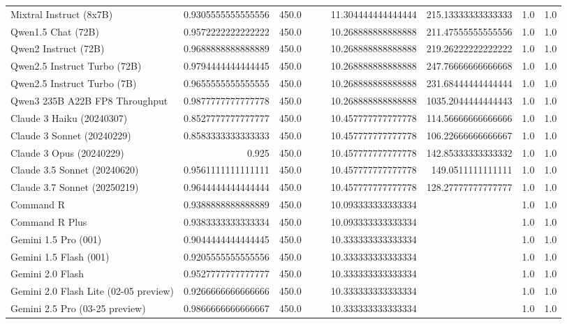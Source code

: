 \begin{table}[htp]
{\begin{tabular}{lrrrrrrrr}
Mixtral Instruct (8x7B) & 0.9305555555555556 & 450.0 &  &  & 11.304444444444444 & 215.13333333333333 & 1.0 & 1.0 \\
Qwen1.5 Chat (72B) & 0.9572222222222222 & 450.0 &  &  & 10.268888888888888 & 211.47555555555556 & 1.0 & 1.0 \\
Qwen2 Instruct (72B) & 0.9688888888888889 & 450.0 &  &  & 10.268888888888888 & 219.26222222222222 & 1.0 & 1.0 \\
Qwen2.5 Instruct Turbo (72B) & 0.9794444444444445 & 450.0 &  &  & 10.268888888888888 & 247.76666666666668 & 1.0 & 1.0 \\
Qwen2.5 Instruct Turbo (7B) & 0.9655555555555555 & 450.0 &  &  & 10.268888888888888 & 231.68444444444444 & 1.0 & 1.0 \\
Qwen3 235B A22B FP8 Throughput & 0.9877777777777778 & 450.0 &  &  & 10.268888888888888 & 1035.2044444444443 & 1.0 & 1.0 \\
Claude 3 Haiku (20240307) & 0.8527777777777777 & 450.0 &  &  & 10.457777777777778 & 114.56666666666666 & 1.0 & 1.0 \\
Claude 3 Sonnet (20240229) & 0.8583333333333333 & 450.0 &  &  & 10.457777777777778 & 106.22666666666667 & 1.0 & 1.0 \\
Claude 3 Opus (20240229) & 0.925 & 450.0 &  &  & 10.457777777777778 & 142.85333333333332 & 1.0 & 1.0 \\
Claude 3.5 Sonnet (20240620) & 0.9561111111111111 & 450.0 &  &  & 10.457777777777778 & 149.0511111111111 & 1.0 & 1.0 \\
Claude 3.7 Sonnet (20250219) & 0.9644444444444444 & 450.0 &  &  & 10.457777777777778 & 128.27777777777777 & 1.0 & 1.0 \\
Command R & 0.9388888888888889 & 450.0 &  &  & 10.093333333333334 &  & 1.0 & 1.0 \\
Command R Plus & 0.9383333333333334 & 450.0 &  &  & 10.093333333333334 &  & 1.0 & 1.0 \\
Gemini 1.5 Pro (001) & 0.9044444444444445 & 450.0 &  &  & 10.333333333333334 &  & 1.0 & 1.0 \\
Gemini 1.5 Flash (001) & 0.9205555555555556 & 450.0 &  &  & 10.333333333333334 &  & 1.0 & 1.0 \\
Gemini 2.0 Flash & 0.9527777777777777 & 450.0 &  &  & 10.333333333333334 &  & 1.0 & 1.0 \\
Gemini 2.0 Flash Lite (02-05 preview) & 0.9266666666666666 & 450.0 &  &  & 10.333333333333334 &  & 1.0 & 1.0 \\
Gemini 2.5 Pro (03-25 preview) & 0.9866666666666667 & 450.0 &  &  & 10.333333333333334 &  & 1.0 & 1.0 \\

\end{tabular}}
\end{table}
